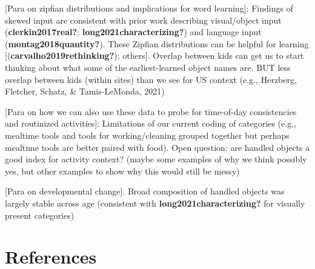 \documentclass[10pt, letterpaper]{article}
\begin{document}
{[}Para on zipfian distributions and implications for word learning{]}:
Findings of skewed input are consistent with prior work describing
visual/object input (\textbf{clerkin2017real?};
\textbf{long2021characterizing?}) and language input
(\textbf{montag2018quantity?}). These Zipfian distributions can be
helpful for learning {[}(\textbf{carvalho2019rethinking?}); others{]}.
Overlap between kids can get us to start thinking about what some of the
earliest-learned object names are. BUT less overlap between kids (within
sites) than we see for US context (e.g., Herzberg, Fletcher, Schatz, \&
Tamis-LeMonda, 2021)

{[}Para on how we can also use these data to probe for time-of-day
consistencies and routinized activities{]}: Limitations of our current
coding of categories (e.g., mealtime tools and tools for
working/cleaning grouped together but perhaps mealtime tools are better
paired with food). Open question: are handled objects a good index for
activity context? (maybe some examples of why we think possibly yes, but
other examples to show why this would still be messy)

{[}Para on developmental change{]}. Broad composition of handled objects
was largely stable across age (consistent with
\textbf{long2021characterizing?} for visually present categories)

\hypertarget{references}{%
\section{References}\label{references}}

\setlength{\parindent}{-0.1in} 
\setlength{\leftskip}{0.125in}

\noindent
\end{document}
